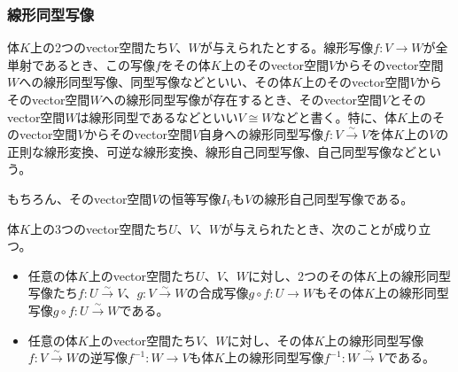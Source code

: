 \documentclass[dvipdfmx]{jsarticle}
\begin{document}
\subsubsection{線形同型写像}%
\begin{dfn}\label{線形同型写像}
体$K$上の2つのvector空間たち$V$、$W$が与えられたとする。線形写像$f:V \rightarrow W$が全単射であるとき、この写像$f$をその体$K$上のそのvector空間$V$からそのvector空間$W$への線形同型写像、同型写像などといい、その体$K$上のそのvector空間$V$からそのvector空間$W$への線形同型写像が存在するとき、そのvector空間$V$とそのvector空間$W$は線形同型であるなどといい$V \cong W$などと書く。特に、体$K$上のそのvector空間$V$からそのvector空間$V$自身への線形同型写像$f:V\overset{\sim}{\rightarrow}V$を体$K$上の$V$の正則な線形変換、可逆な線形変換、線形自己同型写像、自己同型写像などという。
\end{dfn}\par
もちろん、そのvector空間$V$の恒等写像$I_{V}もV$の線形自己同型写像である。
\begin{thm}\label{2.1.2.4}
体$K$上の3つのvector空間たち$U$、$V$、$W$が与えられたとき、次のことが成り立つ。
\begin{itemize}
\item
  任意の体$K$上のvector空間たち$U$、$V$、$W$に対し、2つのその体$K$上の線形同型写像たち$f:U\overset{\sim}{\rightarrow}V$、$g:V\overset{\sim}{\rightarrow}W$の合成写像$g \circ f:U \rightarrow W$もその体$K$上の線形同型写像$g \circ f:U\overset{\sim}{\rightarrow}W$である。
\item
  任意の体$K$上のvector空間たち$V$、$W$に対し、その体$K$上の線形同型写像$f:V\overset{\sim}{\rightarrow}W$の逆写像$f^{- 1}:W \rightarrow V$も体$K$上の線形同型写像$f^{- 1}:W\overset{\sim}{\rightarrow}V$である。
\end{itemize}
\end{thm}
\end{document}
